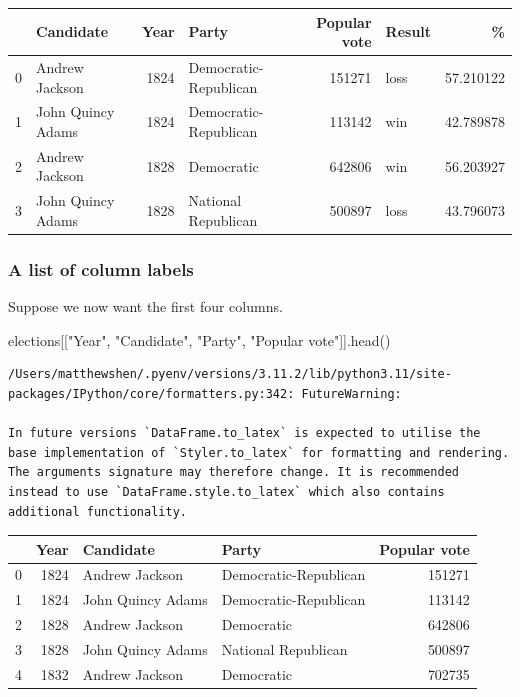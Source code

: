\documentclass[
  letterpaper,
  DIV=11,
  numbers=noendperiod]{scrreprt}
\newenvironment{Shaded}{\begin{snugshade}}{\end{snugshade}}
\newcommand{\NormalTok}[1]{\textcolor[rgb]{0.00,0.23,0.31}{#1}}
\newcommand{\StringTok}[1]{\textcolor[rgb]{0.13,0.47,0.30}{#1}}
\begin{document}
\begin{tabular}{llrlrlr}
\toprule
{} &          Candidate &  Year &                  Party &  Popular vote & Result &          \% \\
\midrule
0 &     Andrew Jackson &  1824 &  Democratic-Republican &        151271 &   loss &  57.210122 \\
1 &  John Quincy Adams &  1824 &  Democratic-Republican &        113142 &    win &  42.789878 \\
2 &     Andrew Jackson &  1828 &             Democratic &        642806 &    win &  56.203927 \\
3 &  John Quincy Adams &  1828 &    National Republican &        500897 &   loss &  43.796073 \\
\bottomrule
\end{tabular}

\hypertarget{a-list-of-column-labels}{%
\subsubsection{A list of column labels}\label{a-list-of-column-labels}}

Suppose we now want the first four columns.

\begin{Shaded}
\begin{Highlighting}[]
\NormalTok{elections[[}\StringTok{"Year"}\NormalTok{, }\StringTok{"Candidate"}\NormalTok{, }\StringTok{"Party"}\NormalTok{, }\StringTok{"Popular vote"}\NormalTok{]].head()}
\end{Highlighting}
\end{Shaded}

\begin{verbatim}
/Users/matthewshen/.pyenv/versions/3.11.2/lib/python3.11/site-packages/IPython/core/formatters.py:342: FutureWarning:

In future versions `DataFrame.to_latex` is expected to utilise the base implementation of `Styler.to_latex` for formatting and rendering. The arguments signature may therefore change. It is recommended instead to use `DataFrame.style.to_latex` which also contains additional functionality.
\end{verbatim}

\begin{tabular}{lrllr}
\toprule
{} &  Year &          Candidate &                  Party &  Popular vote \\
\midrule
0 &  1824 &     Andrew Jackson &  Democratic-Republican &        151271 \\
1 &  1824 &  John Quincy Adams &  Democratic-Republican &        113142 \\
2 &  1828 &     Andrew Jackson &             Democratic &        642806 \\
3 &  1828 &  John Quincy Adams &    National Republican &        500897 \\
4 &  1832 &     Andrew Jackson &             Democratic &        702735 \\
\bottomrule
\end{tabular}
\end{document}
